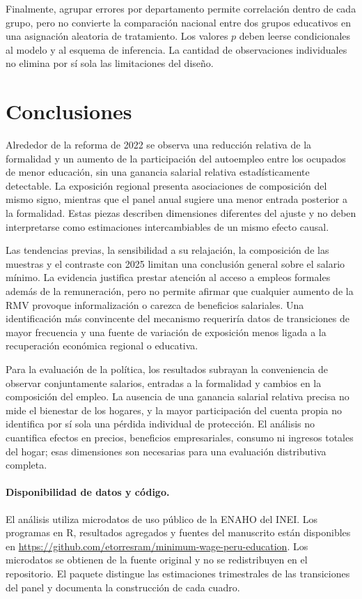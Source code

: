 Finalmente, agrupar errores por departamento permite correlación dentro de cada grupo, pero no convierte la comparación nacional entre dos grupos educativos en una asignación aleatoria de tratamiento. Los valores $p$ deben leerse condicionales al modelo y al esquema de inferencia. La cantidad de observaciones individuales no elimina por sí sola las limitaciones del diseño.

\section{Conclusiones}

Alrededor de la reforma de 2022 se observa una reducción relativa de la formalidad y un aumento de la participación del autoempleo entre los ocupados de menor educación, sin una ganancia salarial relativa estadísticamente detectable. La exposición regional presenta asociaciones de composición del mismo signo, mientras que el panel anual sugiere una menor entrada posterior a la formalidad. Estas piezas describen dimensiones diferentes del ajuste y no deben interpretarse como estimaciones intercambiables de un mismo efecto causal.

Las tendencias previas, la sensibilidad a su relajación, la composición de las muestras y el contraste con 2025 limitan una conclusión general sobre el salario mínimo. La evidencia justifica prestar atención al acceso a empleos formales además de la remuneración, pero no permite afirmar que cualquier aumento de la RMV provoque informalización o carezca de beneficios salariales. Una identificación más convincente del mecanismo requeriría datos de transiciones de mayor frecuencia y una fuente de variación de exposición menos ligada a la recuperación económica regional o educativa.

Para la evaluación de la política, los resultados subrayan la conveniencia de observar conjuntamente salarios, entradas a la formalidad y cambios en la composición del empleo. La ausencia de una ganancia salarial relativa precisa no mide el bienestar de los hogares, y la mayor participación del cuenta propia no identifica por sí sola una pérdida individual de protección. El análisis no cuantifica efectos en precios, beneficios empresariales, consumo ni ingresos totales del hogar; esas dimensiones son necesarias para una evaluación distributiva completa.

\paragraph{Disponibilidad de datos y código.}
El análisis utiliza microdatos de uso público de la ENAHO del INEI. Los programas en R, resultados agregados y fuentes del manuscrito están disponibles en \url{https://github.com/etorresram/minimum-wage-peru-education}. Los microdatos se obtienen de la fuente original y no se redistribuyen en el repositorio. El paquete distingue las estimaciones trimestrales de las transiciones del panel y documenta la construcción de cada cuadro.
